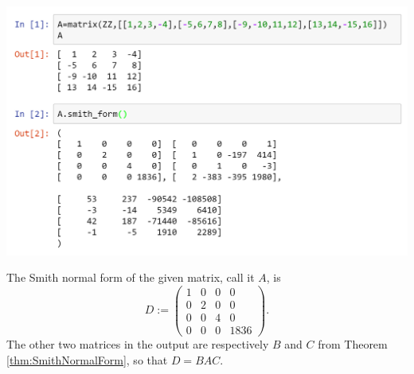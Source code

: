 \documentclass[../algebraNotesMSRI-UP2016.tex]{subfiles}
\begin{document}
\begin{frame}
\includegraphics[scale=0.6]{smithForm}
\end{frame}

\begin{frame}[c]
The Smith normal form of the given matrix, call it $A$, is 
\[
D:=\begin{pmatrix}
1 & 0 & 0 & 0 \\
0 & 2 & 0 & 0 \\
0 & 0 & 4 & 0 \\
0 & 0 & 0 & 1836
\end{pmatrix}.
\]
The other two matrices in the output are respectively $B$ and $C$ from Theorem \ref{thm:SmithNormalForm}, so that $D=BAC$.
\end{frame}

\end{document}
